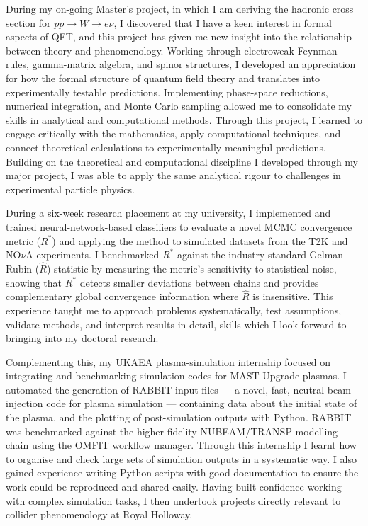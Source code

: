 \documentclass[11pt]{report}
\begin{document}
\begin{titlepage}
	During my on-going Master’s project, in which I am deriving the hadronic cross section for $pp \rightarrow W \rightarrow e\nu$, I discovered that I have a keen interest in formal aspects of QFT, and this project has given me new insight into the relationship between theory and phenomenology. Working through electroweak Feynman rules, gamma-matrix algebra, and spinor structures, I developed an appreciation for how the formal structure of quantum field theory and translates into experimentally testable predictions. Implementing phase-space reductions, numerical integration, and Monte Carlo sampling allowed me to consolidate my skills in analytical and computational methods. Through this project, I learned to engage critically with the mathematics, apply computational techniques, and connect theoretical calculations to experimentally meaningful predictions. Building on the theoretical and computational discipline I developed through my major project, I was able to  apply the same analytical rigour to challenges in experimental particle physics.\\
		\vspace{0.7em}
		
		During a six-week research placement at my university, I implemented and trained neural-network-based classifiers to evaluate a novel MCMC convergence metric ($R^*$) and applying the method to simulated datasets from the T2K and NO$\nu$A experiments. I benchmarked $R^*$ against the industry standard Gelman-Rubin ($\hat{R}$) statistic by measuring the metric’s sensitivity to statistical noise, showing that $R^*$ detects smaller deviations between chains and provides complementary global convergence information where  $\hat{R}$ is insensitive. This experience taught me to approach problems systematically, test assumptions, validate methods, and interpret results in detail, skills which I look forward to bringing into my doctoral research.\\
		\vspace{0.7em}
		
		Complementing this, my UKAEA plasma-simulation internship focused on integrating and benchmarking simulation codes for MAST-Upgrade plasmas. I automated the generation of RABBIT input files --- a novel, fast, neutral-beam injection code for plasma simulation --- containing data about the initial state of the plasma, and the plotting of post-simulation outputs with Python. RABBIT was benchmarked against the higher-fidelity NUBEAM/TRANSP modelling chain using the OMFIT workflow manager. Through this internship I learnt how to organise and check large sets of simulation outputs in a systematic way. I also gained experience writing Python scripts with good documentation to ensure the work could be reproduced and shared easily. Having built confidence working with complex simulation tasks, I then undertook projects directly relevant to collider phenomenology at Royal Holloway.\\
		\vspace{0.7em}
		

\end{titlepage}
\end{document}
